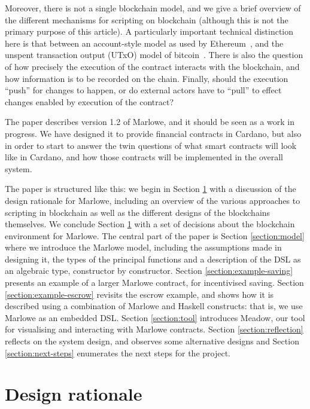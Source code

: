 \documentclass[
      acmsmall
    , screen
  ]{acmart}
\begin{document}
Moreover, there is not a single blockchain model, and we give a brief overview of the different mechanisms for scripting on blockchain (although this is not the primary purpose of this article). 
A particularly important technical distinction here is that between an account-style model as used by Ethereum~\cite{EthereumRationale}, and the unspent transaction output (UTxO) model of bitcoin~\cite{sok}. 
There is also the question of how precisely the execution of the contract interacts with the blockchain, and how information is to be recorded on the chain. Finally, should the execution ``push'' for changes  to happen, or do external actors have to ``pull'' to effect changes enabled by execution of the contract?

The paper describes version 1.2 of Marlowe, and it should be seen as a work in progress. We have designed it to provide financial contracts in Cardano, but also in order to start to answer the twin
 questions of what smart contracts will look like in Cardano, and how those contracts will be implemented in the overall system.

The paper is structured like this: we begin in Section \ref{section:design} with a discussion of the design rationale for Marlowe, including an overview of the various approaches to scripting in blockchain as well as the different designs of the blockchains themselves. We conclude Section \ref{section:design} with a set of decisions about the blockchain environment for Marlowe. The central part of the paper is Section \ref{section:model} where we introduce the Marlowe model, including the assumptions made in designing 
it, the types of the principal functions and a description of the DSL as an algebraic type, constructor by constructor. 
Section \ref{section:example-saving} presents an example of a larger Marlowe contract, for incentivised saving. Section \ref{section:example-escrow} revisits the escrow example, and shows how it is described using a combination of Marlowe and Haskell constructs: that is, we use Marlowe as an embedded DSL. Section 
\ref{section:tool} introduces Meadow, our tool for visualising and interacting with Marlowe contracts.
Section \ref{section:reflection} reflects on the system design, and observes some alternative designs and Section \ref{section:next-steps} enumerates the next steps for the project.



\section{Design rationale}
\label{section:design}
\end{document}
